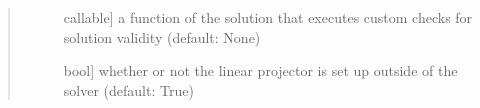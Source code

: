 \documentclass[letterpaper,10pt,english]{sphinxmanual}
\begin{document}
\begin{fulllineitems}
\begin{quote}
\begin{description}
\begin{description}
\item[{}] \leavevmode{[}callable{]}
a function of the solution that executes custom checks for solution validity (default: None)

\item[{}] \leavevmode{[}bool{]}
whether or not the linear projector is set up outside of the solver (default: True)

\end{description}

\end{description}\end{quote}

\begin{fulllineitems}
\label{\detokenize{spitfire.time.nonlinear:spitfire.time.nonlinear.SimpleNewtonSolver.evaluate_jacobian_every_iter}}~
\end{fulllineitems}


\end{fulllineitems}

\end{document}
